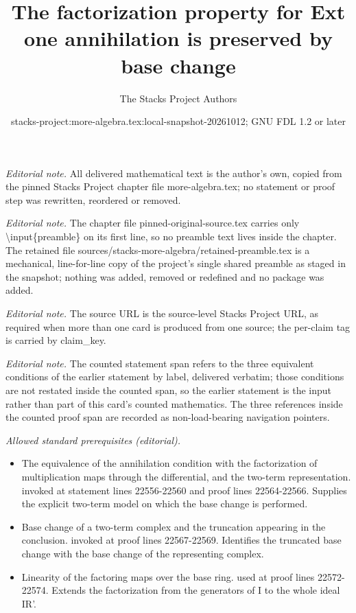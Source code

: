 \documentclass[10pt,a4paper]{amsart}
\title{The factorization property for Ext one annihilation is preserved by base change}
\author{The Stacks Project Authors}
\date{stacks-project:more-algebra.tex:local-snapshot-20261012; GNU FDL 1.2 or later}
\theoremstyle{plain}
\theoremstyle{definition}
\theoremstyle{remark}
\numberwithin{equation}{subsection}
\begin{document}
\maketitle
\setcounter{subsection}{1}
\noindent\textit{Editorial note.} All delivered mathematical text is the author's own, copied from the pinned Stacks Project chapter file more-algebra.tex; no statement or proof step was rewritten, reordered or removed.\par\medskip
\noindent\textit{Editorial note.} The chapter file pinned-original-source.tex carries only \textbackslash{}input\{preamble\} on its first line, so no preamble text lives inside the chapter. The retained file sources/stacks-more-algebra/retained-preamble.tex is a mechanical, line-for-line copy of the project's single shared preamble as staged in the snapshot; nothing was added, removed or redefined and no package was added.\par\medskip
\noindent\textit{Editorial note.} The source URL is the source-level Stacks Project URL, as required when more than one card is produced from one source; the per-claim tag is carried by claim\_key.\par\medskip
\noindent\textit{Editorial note.} The counted statement span refers to the three equivalent conditions of the earlier statement by label, delivered verbatim; those conditions are not restated inside the counted span, so the earlier statement is the input rather than part of this card's counted mathematics. The three references inside the counted proof span are recorded as non-load-bearing navigation pointers.\par\medskip
\noindent\textit{Allowed standard prerequisites (editorial).}\begin{itemize}
\item The equivalence of the annihilation condition with the factorization of multiplication maps through the differential, and the two-term representation. invoked at statement lines 22556-22560 and proof lines 22564-22566. Supplies the explicit two-term model on which the base change is performed.
\item Base change of a two-term complex and the truncation appearing in the conclusion. invoked at proof lines 22567-22569. Identifies the truncated base change with the base change of the representing complex.
\item Linearity of the factoring maps over the base ring. used at proof lines 22572-22574. Extends the factorization from the generators of I to the whole ideal IR'.
\end{itemize}\medskip
\end{document}
